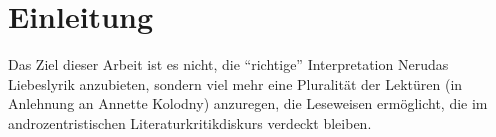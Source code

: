 \section{Einleitung}

Das Ziel dieser Arbeit ist es nicht, die ``richtige'' Interpretation Nerudas Liebeslyrik anzubieten, sondern viel mehr eine Pluralität der Lektüren (in Anlehnung an Annette Kolodny) anzuregen, die Leseweisen ermöglicht, die im androzentristischen Literaturkritikdiskurs verdeckt bleiben.


\begin{comment}
1. Intro
  * Ziel von Feministischen Lektüren: zugrunde liegende Machtstrukturen in Werken und deren Rezeption aufzudecken
    ** androzentrische Perspektive der Literatur:
       *** Männer in Mittelpunkt (als Figuren)
       *** von Männern gemacht
       *** an Männer gerichtet
  * Wie erreicht? Durch eine Pluralität der Lektüren und Close Reading
ohne das ouevre Nerudas nicht als ganzes in Frage stellen
exemplarische Lektüren: Poetisierung bestimmter Heteronormativen Perspektiven
gehört historisiert; nicht als zeitlos darzustellen
\end{comment}
